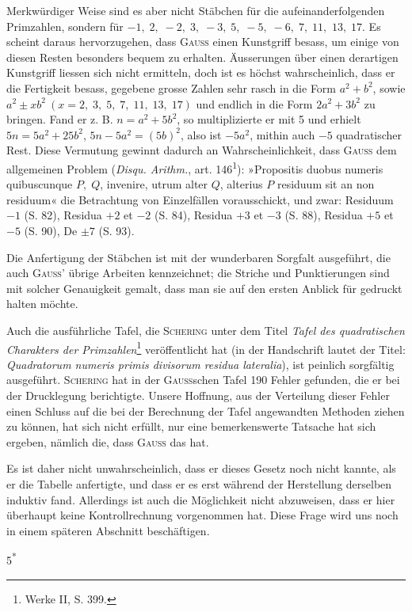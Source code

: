 Merkwürdiger Weise sind es aber nicht Stäbchen für die aufeinanderfolgenden Primzahlen, sondern für $-1,\;2,\;-2,\;3,\;-3,\;5,\;-5,\;-6,\;7,\;11,$
$13,\;17$. Es scheint daraus hervorzugehen, dass \textsc{Gauss} einen Kunstgriff besass,
um einige von diesen Resten besonders bequem zu erhalten. Äusserungen
über einen derartigen Kunstgriff liessen sich nicht ermitteln, doch ist es höchst
wahrscheinlich, dass er die Fertigkeit besass, gegebene grosse Zahlen sehr
\clearpage{}
\setcounter{footnote}{0}
\noindent rasch in die Form $a^2+b^2$, sowie $a^2\pm xb^2\ (x=2,\;3,\;5,\;7,\;11,\;13,\;17)$ und endlich in die Form $2a^2+3b^2$ zu bringen. Fand er z. B. $n=a^2+5b^2$, so
multiplizierte er mit 5 und erhielt $5n=5a^2+25b^2$, $5n-5a^2=(5b)^2$, also
ist $-5a^2$, mithin auch $-5$ quadratischer Rest. Diese Vermutung gewinnt
dadurch an Wahrscheinlichkeit, dass \textsc{Gauss} dem allgemeinen Problem (\textit{Disqu.
Arithm.}, art. 146\textsuperscript{1}): »Propositis duobus numeris quibuscunque $P,\;Q$, invenire,
utrum alter $Q$, alterius $P$ residuum sit an non residuum« die Betrachtung von
Einzelfällen vorausschickt, und zwar: Residuum $-1$ (S. 82), Residua $+2$ et
$-2$ (S. 84), Residua $+3$ et $-3$ (S. 88), Residua $+5$ et $-5$ (S. 90), De $\pm7$
(S. 93).
\setcounter{footnote}{1}

Die Anfertigung der Stäbchen ist mit der wunderbaren Sorgfalt ausgeführt, die auch \textsc{Gauss}’ übrige Arbeiten kennzeichnet; die Striche und Punktierungen sind mit solcher Genauigkeit gemalt, dass man sie auf den ersten
Anblick für gedruckt halten möchte.

Auch die ausführliche Tafel, die \textsc{Schering} unter dem Titel \textit{Tafel des
quadratischen Charakters der Primzahlen}\footnote{Werke II, S. 399.} veröffentlicht hat (in der Handschrift
lautet der Titel: \textit{Quadratorum numeris primis divisorum residua lateralia}), ist
peinlich sorgfältig ausgeführt. \textsc{Schering} hat in der \textsc{Gauss}schen Tafel 190
Fehler gefunden, die er bei der Drucklegung berichtigte. Unsere Hoffnung,
aus der Verteilung dieser Fehler einen Schluss auf die bei der Berechnung
der Tafel angewandten Methoden ziehen zu können, hat sich nicht erfüllt,
nur eine bemerkenswerte Tatsache hat sich ergeben, nämlich die, dass \textsc{Gauss}
das  hat.

Es ist daher nicht unwahrscheinlich, dass er dieses Gesetz noch nicht
kannte, als er die Tabelle anfertigte, und dass er es erst während der Herstellung derselben induktiv fand. Allerdings ist auch die Möglichkeit nicht
abzuweisen, dass er hier überhaupt keine Kontrollrechnung vorgenommen hat.
Diese Frage wird uns noch in einem späteren Abschnitt beschäftigen.
\par\hfill 5\textsuperscript{*}
\clearpage\endgroup

